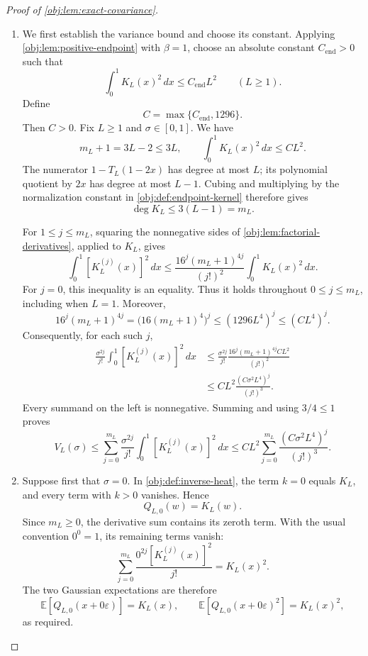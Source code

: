 \documentclass[11pt]{article}
\begin{document}
\begin{proof}[Proof of \cref{obj:lem:exact-covariance}]
\begin{enumerate}
\item We first establish the variance bound and choose its constant. Applying \cref{obj:lem:positive-endpoint} with \(\beta=1\), choose an absolute constant \(C_{\mathrm{end}}>0\) such that
\[
\int_0^1 K_L(x)^2\,dx\le C_{\mathrm{end}}L^2
\qquad(L\ge1).
\]
Define
\[
C=\max\{C_{\mathrm{end}},1296\}.
\]
Then \(C>0\). Fix \(L\ge1\) and \(\sigma\in[0,1]\). We have
\[
m_L+1=3L-2\le3L,
\qquad
\int_0^1 K_L(x)^2\,dx\le CL^2.
\]
The numerator \(1-T_L(1-2x)\) has degree at most \(L\); its polynomial quotient by \(2x\) has degree at most \(L-1\). Cubing and multiplying by the normalization constant in \cref{obj:def:endpoint-kernel} therefore gives
\[
\deg K_L\le3(L-1)=m_L.
\]

For \(1\le j\le m_L\), squaring the nonnegative sides of \cref{obj:lem:factorial-derivatives}, applied to \(K_L\), gives
\[
\int_0^1 [K_L^{(j)}(x)]^2\,dx
\le
\frac{16^j(m_L+1)^{4j}}{(j!)^2}
\int_0^1 K_L(x)^2\,dx.
\]
For \(j=0\), this inequality is an equality. Thus it holds throughout \(0\le j\le m_L\), including when \(L=1\). Moreover,
\[
16^j(m_L+1)^{4j}
=\bigl(16(m_L+1)^4\bigr)^j
\le(1296L^4)^j
\le(CL^4)^j.
\]
Consequently, for each such \(j\),
\[
\begin{aligned}
\frac{\sigma^{2j}}{j!}
\int_0^1 [K_L^{(j)}(x)]^2\,dx
&\le
\frac{\sigma^{2j}}{j!}
\frac{16^j(m_L+1)^{4j}CL^2}{(j!)^2}\\
&\le
CL^2\frac{(C\sigma^2L^4)^j}{(j!)^3}.
\end{aligned}
\]
Every summand on the left is nonnegative. Summing and using \(3/4\le1\) proves
\[
V_L(\sigma)
\le
\sum_{j=0}^{m_L}\frac{\sigma^{2j}}{j!}
\int_0^1 [K_L^{(j)}(x)]^2\,dx
\le
CL^2\sum_{j=0}^{m_L}
\frac{(C\sigma^2L^4)^j}{(j!)^3}.
\]

\item Suppose first that \(\sigma=0\). In \cref{obj:def:inverse-heat}, the term \(k=0\) equals \(K_L\), and every term with \(k>0\) vanishes. Hence
\[
Q_{L,0}(w)=K_L(w).
\]
Since \(m_L\ge0\), the derivative sum contains its zeroth term. With the usual convention \(0^0=1\), its remaining terms vanish:
\[
\sum_{j=0}^{m_L}\frac{0^{2j}[K_L^{(j)}(x)]^2}{j!}
=K_L(x)^2.
\]
The two Gaussian expectations are therefore
\[
\mathbb E[Q_{L,0}(x+0\varepsilon)]=K_L(x),
\qquad
\mathbb E[Q_{L,0}(x+0\varepsilon)^2]=K_L(x)^2,
\]
as required.


\end{enumerate}
\end{proof}
\end{document}
